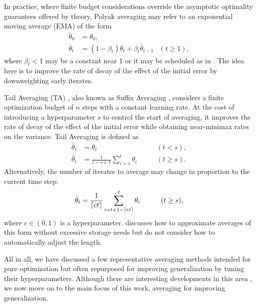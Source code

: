 \documentclass[twocolumn]{article}
\DeclarePairedDelimiter{\ceil}{\lceil}{\rceil}
\begin{document}
In practice, where finite budget considerations override the asymptotic optimality guarantees offered by theory, Polyak averaging may refer to an exponential moving average (EMA) of the form
\begin{equation}
\label{eq:ema}
\begin{aligned}
\bar{\theta}_0 &= \theta_0,\\
\bar{\theta}_t &= (1-\beta_t)\theta_t + \beta_t\bar{\theta}_{t-1} & (t \geq 1),
\end{aligned}
\end{equation}
where $\beta_t < 1$ may be a constant near $1$ or it may be scheduled as in \citet{martens2020new}.
The idea here is to improve the rate of decay of the effect of the initial error by downweighting early iterates.

Tail Averaging (TA) \citep{jain2018parallelizing}, also known as Suffix Averaging \citep{rakhlin2011making}, considers a finite optimization budget of $n$ steps with a constant learning rate.
At the cost of introducing a hyperparameter $s$ to control the start of averaging, it improves the rate of decay of the effect of the initial error while obtaining near-minimax rates on the variance.
Tail Averaging is defined as
\begin{equation}
\label{eq:tail-averaging}
\begin{aligned}
\bar{\theta}_t &= \theta_t & \qquad (t < s),\\
\bar{\theta}_t &= \frac{1}{t-s+1} \sum_{i=s}^t \theta_i & \qquad (t \geq s).
\end{aligned}
\end{equation}
Alternatively, the number of iterates to average may change in proportion to the current time step:
\begin{equation*}
\begin{aligned}
\bar{\theta}_t &= \frac{1}{\ceil{ct}} \sum_{i=t+1 - \ceil{ct}}^t \theta_i & \qquad (t \geq s),
\end{aligned}
\end{equation*}
where $c \in (0,1)$ is a hyperparameter.
\citet{roux2019anytime} discusses how to approximate averages of this form without excessive storage needs but do not consider how to automatically adjust the length.

All in all, we have discussed a few representative averaging methods intended for pure optimization but often repurposed for improving generalization by tuning their hyperparameters.
Although there are interesting developments in this area \citep{shamir2013stochastic,lacoste2012simpler}, we now move on to the main focus of this work, averaging for improving generalization.
\end{document}

